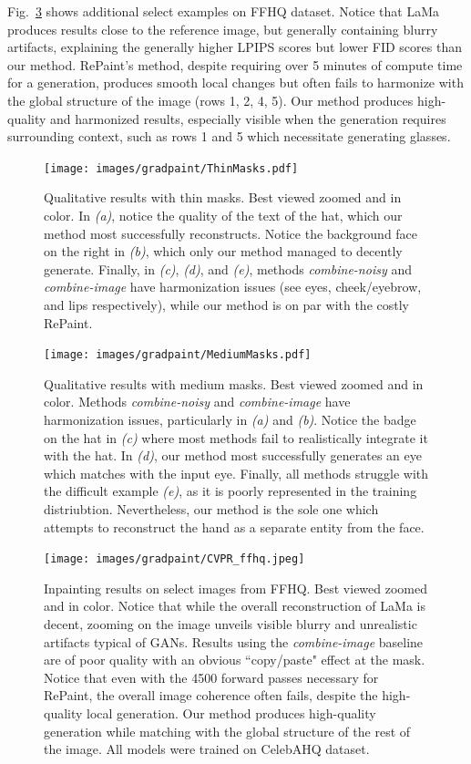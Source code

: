 Fig.~\ref{fig:res_ffhq} shows additional select examples on FFHQ dataset. Notice that LaMa produces results
 close to the reference image, but generally containing blurry artifacts, explaining the generally higher
  LPIPS scores but lower FID scores than our method. RePaint's method, despite requiring over 5 minutes of 
  compute time for a generation, produces smooth local changes but often fails to harmonize with the global
   structure of the image (rows 1, 2, 4, 5). Our method produces high-quality and harmonized results, especially
    visible when the generation requires surrounding context, such as rows 1 and 5 which necessitate generating glasses.

\begin{figure}[H]
    \centering
    \texttt{[image: images/gradpaint/ThinMasks.pdf]}
    \caption{Qualitative results with thin masks. Best viewed zoomed and in color. In \emph{(a)}, notice the quality of the text of the hat, which our method most successfully reconstructs. Notice the background face on the right in \emph{(b)}, which only our method managed to decently generate. Finally, in \emph{(c)}, \emph{(d)}, and \emph{(e)}, methods \emph{combine-noisy} and \emph{combine-image} have harmonization issues (see eyes, cheek/eyebrow, and lips respectively), while our method is on par with the costly RePaint.}
\label{fig:qualitative_thin}
\end{figure}

\begin{figure}[H]
    \centering
    \texttt{[image: images/gradpaint/MediumMasks.pdf]}
    \caption{Qualitative results with medium masks. Best viewed zoomed and in color. Methods \emph{combine-noisy} and \emph{combine-image} have harmonization issues, particularly in \emph{(a)} and \emph{(b)}. Notice the badge on the hat in \emph{(c)} where most methods fail to realistically integrate it with the hat. In \emph{(d)}, our method most successfully generates an eye which matches with the input eye. Finally, all methods struggle with the difficult example \emph{(e)}, as it is poorly represented in the training distriubtion.  Nevertheless, our method is the sole one which attempts to reconstruct the hand as a separate entity from the face.}
\label{fig:qualitative_thick}
\end{figure}

\begin{figure}[H]
  \centering
    \texttt{[image: images/gradpaint/CVPR\_ffhq.jpeg]}
    \caption{Inpainting results on select images from FFHQ. Best viewed zoomed and in color. Notice that while the overall reconstruction of LaMa is decent, zooming on the image unveils visible blurry and unrealistic artifacts typical of GANs. Results using the \emph{combine-image} baseline are of poor quality with an obvious ``copy/paste" effect at the mask. Notice that even with the 4500 forward passes necessary for RePaint, the overall image coherence often fails, despite the high-quality local generation.  Our method produces high-quality generation while matching with the global structure of the rest of the image. All models were trained on CelebAHQ dataset.}
\label{fig:res_ffhq}
\end{figure}



